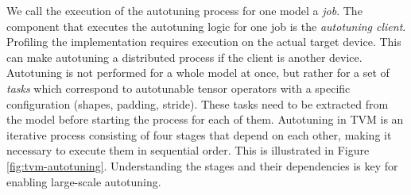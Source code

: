 We call the execution of the autotuning process for one model a \textit{job}. The component that executes the autotuning logic for one job is the \textit{autotuning client}. Profiling the implementation requires execution on the actual target device. This can make autotuning a distributed process if the client is another device. Autotuning is not performed for a whole model at once, but rather for a set of \textit{tasks} which correspond to autotunable tensor operators with a specific configuration (shapes, padding, stride). These tasks need to be extracted from the model before starting the process for each of them. Autotuning in TVM is an iterative process consisting of four stages that depend on each other, making it necessary to execute them in sequential order. This is illustrated in Figure \ref{fig:tvm-autotuning}. Understanding the stages and their dependencies is key for enabling large-scale autotuning.
